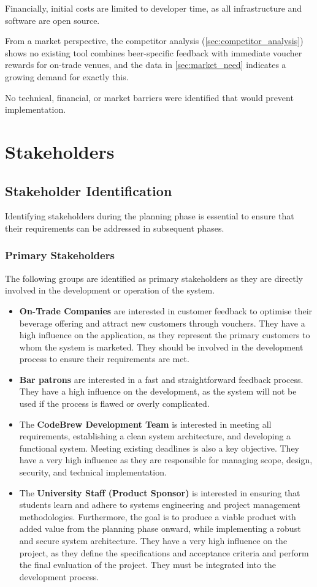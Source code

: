 \documentclass[a4paper,12pt]{article}
\begin{document}
Financially, initial costs are limited to developer time, as all infrastructure and software are open source.

From a market perspective, the competitor analysis (\autoref{sec:competitor_analysis}) shows no existing tool combines beer-specific feedback with immediate voucher rewards for on-trade venues, and the data in \autoref{sec:market_need} indicates a growing demand for exactly this.

No technical, financial, or market barriers were identified that would prevent implementation.

\section{Stakeholders}
\subsection{Stakeholder Identification}
Identifying stakeholders during the planning phase is essential to ensure that their requirements can be addressed in subsequent phases.

\subsubsection{Primary Stakeholders}
The following groups are identified as primary stakeholders as they are directly involved in the development or operation of the system.

\begin{itemize}
	\item \textbf{On-Trade Companies} are interested in customer feedback to optimise their beverage offering and attract new customers through vouchers.
	      They have a high influence on the application, as they represent the primary customers to whom the system is marketed.
	      They should be involved in the development process to ensure their requirements are met.
	\item \textbf{Bar patrons} are interested in a fast and straightforward feedback process.
	      They have a high influence on the development, as the system will not be used if the process is flawed or overly complicated.
	\item The \textbf{CodeBrew Development Team} is interested in meeting all requirements, establishing a clean system architecture, and developing a functional system.
	      Meeting existing deadlines is also a key objective. They have a very high influence as they are responsible for managing scope, design, security, and technical implementation.
	\item The \textbf{University Staff (Product Sponsor)} is interested in ensuring that students learn and adhere to systems engineering and project management methodologies.
	      Furthermore, the goal is to produce a viable product with added value from the planning phase onward, while implementing a robust and secure system architecture.
	      They have a very high influence on the project, as they define the specifications and acceptance criteria and perform the final evaluation of the project.
	      They must be integrated into the development process.
\end{itemize}
\end{document}
